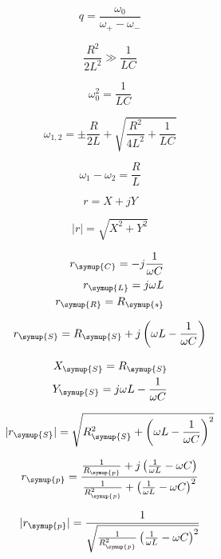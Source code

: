     \begin{equation}
        q = \frac{\omega_0}{\omega_+ - \omega_-} \nonumber
    \end{equation}

    \begin{equation}
        \frac{R^2}{2L^2} \gg \frac{1}{LC} \nonumber
    \end{equation}

    \begin{equation}
        \omega^2_0 = \frac{1}{LC} \nonumber
    \end{equation}

    \begin{equation}
        \omega_{1,2} = \pm  \frac{R}{2L} + \sqrt{\frac{R^2}{4L^2}+ \frac{1}{LC}} \nonumber
    \end{equation}

    \begin{equation}
        \omega_1 - \omega_2 = \frac{R}{L} \nonumber
    \end{equation}

    \begin{equation}
        r = X + jY \nonumber
    \end{equation}

    \begin{equation}
        |r| = \sqrt{X^2 + Y^2} \nonumber
    \end{equation}

    \begin{align}
        r_{\symup{C}} = -j\frac{1}{\omega C} \nonumber\\
        r_{\symup{L}} = j\omega L  \nonumber\\
        r_{\symup{R}} = R_{\symup{s}} \nonumber
    \end{align}

    \begin{equation}
        r_{\symup{S}} = R_{\symup{S}} + j \left(    \omega L - \frac{1}{\omega C} \right) \nonumber
    \end{equation}

    \begin{align}
        X_{\symup{S}} = R_{\symup{S}}  \nonumber\\ 
        Y_{\symup{S}} = j \omega L - \frac{1}{\omega C} \nonumber
    \end{align}

    \begin{equation}
        |r_{\symup{S}}| = \sqrt{R^2_{\symup{S}} + \left( \omega L - \frac{1}{\omega C} \right)^2} \nonumber
    \end{equation}

    \begin{equation}
        r_{\symup{p}} = \frac{\frac{1}{R_{\symup{p}}}+j \left( \frac{1}{\omega L} - \omega C \right)}{\frac{1}{R^2_{\symup{p}}}+ \left( \frac{1}{\omega L} - \omega C \right)^2} \nonumber
    \end{equation}

    \begin{equation}
        |r_{\symup{p}}|=  \frac{1}{\sqrt{\frac{1}{R^2_{\symup{p}}} \left( \frac{1}{\omega L} - \omega C \right)^2}} \nonumber
    \end{equation}
